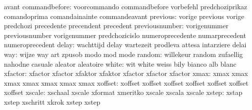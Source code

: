                            avant
            commandbefore: voorcommando              commandbefore
                           vorbefehl                 predchoziprikaz
                           comandoprima              comandainainte
                           commandeavant
                 previous: vorige                    previous
                           vorige                    predchozi
                           precedente                precendent
                           precedent
           previousnumber: vorigenummer              previousnumber
                           vorigenummer              predchozicislo
                           numeroprecedente          numarprecedent
                           numeroprecedent
                    delay: wachttijd                 delay
                           wartezeit                 prodleva
                           attesa                    intarziere
                           delai
                      way: wijze                     way
                           art                       zpusob
                           modo                      mod
                           mode
                   random: willekeur                 random
                           zufaellig                 nahodne
                           casuale                   aleator
                           aleatoire
                    white: wit                       white
                           weiss                     bily
                           bianco                    alb
                           blanc
                  xfactor: xfactor                   xfactor
                           xfaktor                   xfaktor
                           xfactor                   xfactor
                           xfactor
                     xmax: xmax                      xmax
                           xmax                      xmax
                           xmax                      xmax
                           xmax
                  xoffset: xoffset                   xoffset
                           xoffset                   xoffset
                           xoffset                   xoffset
                           xoffset
                   xscale: xschaal                   xscale
                           xformat                   xmeritko
                           xscale                    xscala
                           xscale
                    xstep: xstap                     xstep
                           xschritt                  xkrok
                           xstep                     xstep
